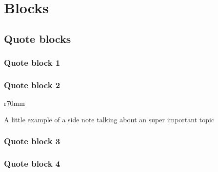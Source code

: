 \section{Blocks}

\subsection{Quote blocks}
\subsubsection{Quote block 1}

\lipsum[10]

\begin{center}
\begin{nierbox}[title=Important note]
  \nierdiamond \lipsum[11]
\end{nierbox}
\end{center}

\subsubsection{Quote block 2}

\begin{wrapfigure}{r}{70mm}
\begin{nierbox}[title=Some more important side-box, width=70mm, height=25mm]
    A little example of a side note talking about an super important topic
\end{nierbox}
\end{wrapfigure}

\lipsum[14]

\subsubsection{Quote block 3}

\lipsum[15]

\begin{center}
\begin{nierbox}
  \nierdiamond\lipsum[16]
\end{nierbox}
\end{center}

\subsubsection{Quote block 4}

\lipsum[17]

\begin{center}
\begin{nierquotebox}
    \nierdiamond\lipsum[18]
\end{nierquotebox}
\end{center}

